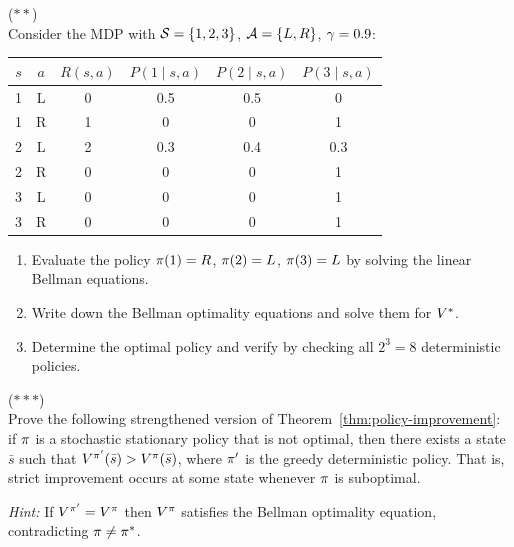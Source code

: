 \documentclass[11pt,a4paper]{article}
\begin{document}
\begin{exercise}
\textnormal{(\(**\))} \\
Consider the MDP with $\mathcal{S} = \{1, 2, 3\}$,
$\mathcal{A} = \{L, R\}$, $\gamma = 0.9$:
\begin{center}
\begin{tabular}{cccccc}
\toprule
$s$ & $a$ & $R(s,a)$ & $P(1 \mid s,a)$ & $P(2 \mid s,a)$ &
$P(3 \mid s,a)$ \\
\midrule
1 & L & 0 & 0.5 & 0.5 & 0 \\
1 & R & 1 & 0 & 0 & 1 \\
2 & L & 2 & 0.3 & 0.4 & 0.3 \\
2 & R & 0 & 0 & 0 & 1 \\
3 & L & 0 & 0 & 0 & 1 \\
3 & R & 0 & 0 & 0 & 1 \\
\bottomrule
\end{tabular}
\end{center}
\begin{enumerate}[label=(\alph*)]
    \item Evaluate the policy $\pi(1) = R$, $\pi(2) = L$,
    $\pi(3) = L$ by solving the linear Bellman equations.
    \item Write down the Bellman optimality equations and solve them
    for $V^*$.
    \item Determine the optimal policy and verify by checking all
    $2^3 = 8$ deterministic policies.
\end{enumerate}
\end{exercise}

\begin{exercise}
\textnormal{(\(***\))} \\
Prove the following strengthened version of
Theorem~\ref{thm:policy-improvement}: if $\pi$ is a stochastic
stationary policy that is not optimal, then there exists a state
$\bar{s}$ such that $V^{\pi'}(\bar{s}) > V^{\pi}(\bar{s})$, where
$\pi'$ is the greedy deterministic policy. That is, strict
improvement occurs at some state whenever $\pi$ is suboptimal.

\textit{Hint:} If $V^{\pi'} = V^{\pi}$ then $V^{\pi}$ satisfies the
Bellman optimality equation, contradicting $\pi \neq \pi^*$.
\end{exercise}

\end{document}
